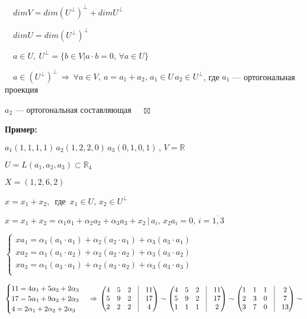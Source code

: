 \documentclass[a4paper, 12pt]{report}
\begin{document}
	$\quad dim V=dim (U^{\perp})^{\perp}+dim U^{\perp}$
	
	$\quad dim U=dim (U^{\perp})^{\perp} $
	
	$\quad a \in U,\ U^{\perp}=\{b \in V| a\cdot b=0, \, \forall a \in U\}$
	
	$\quad a \in  (U^{\perp})^{\perp} \, \Rightarrow \, \forall a \in V,\ a=a_1+a_2, \, a_1 \in U \, a_2 \in U^{\perp}$, где $a_1$ --- ортогональная проекция 
	
	\quad$a_2$ --- ортогональная составляющая $\quad \boxtimes$
	\par\bigskip
	\textbf{Пример:}\par
	$ a_1(1,1,1,1) \, a_2(1,2,2,0) \, a_3(0,1,0,1) \, , \, V=\mathbb{R}$\par
	$ U=L(a_1,a_2,a_3) \subset \mathbb{R}_4$\par
	$ X=(1,2,6,2)$\par
	$ x=x_1+x_2, \,$ где $\, x_1 \in U, \, x_2 \in U^{\perp}$\par
	$ x=x_1+x_2=\alpha_1 a_1+ \alpha_2 a_2+\alpha_3 a_3 + x_2 \, | \, a_i, \, x_2 a_i=0, \, i=\overline{1,3}$\par
	$ \begin{cases}
		x a_1=\alpha_1(a_1 \cdot a_1)+ \alpha_2 (a_2 \cdot a_1)+ \alpha_3(a_3 \cdot a_1)\\
		x a_2=\alpha_1(a_1 \cdot a_2)+ \alpha_2 (a_2 \cdot a_2)+ \alpha_3(a_3 \cdot a_2)\\
		x a_3=\alpha_1(a_3 \cdot a_1)+ \alpha_2 (a_3 \cdot a_2)+ \alpha_3(a_3 \cdot a_3)\\
	\end{cases}$\par
	$\begin{cases}
		11=4 \alpha_1+5 \alpha_2 + 2 \alpha_3\\
		17=5 \alpha_1+9 \alpha_2 + 2 \alpha_3\\
		4=2 \alpha_1+ 2\alpha_2 + 2 \alpha_3\\
	\end{cases} \, \Rightarrow \,
	\begin{pmatrix}
		4&5&2&\vrule&11\\
		5&9&2&\vrule&17\\
		2&2&2&\vrule&4\\
	\end{pmatrix} \sim \begin{pmatrix}
		4&5&2&\vrule&11\\
		5&9&2&\vrule&17\\
		1&1&1&\vrule&2\\
	\end{pmatrix} \sim \begin{pmatrix}
		1&1&1&\vrule&2\\
		2&3&0&\vrule&7\\
		3&7&0&\vrule&13\\
	\end{pmatrix} \sim$
	
\end{document}
